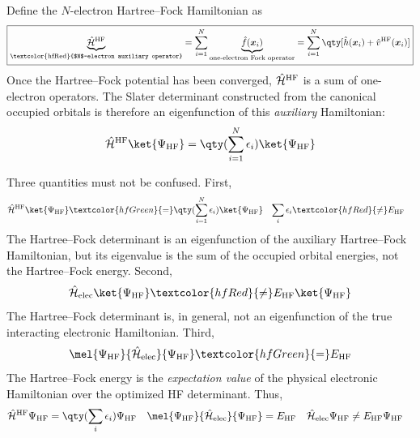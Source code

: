 \documentclass[11pt,a4paper,titlepage]{article}
\numberwithin{equation}{section}
\newcommand{\bx}{\boldsymbol{x}}
\newcommand{\hh}{\Hat{h}}
\newcommand{\hf}{\Hat{f}}
\newcommand{\chH}{\Hat{\mathcal{H}}}
\newcommand{\red}[1]{\textcolor{hfRed}{#1}}
\newcommand{\green}[1]{\textcolor{hfGreen}{#1}}
\begin{document}
Define the $N$-electron Hartree--Fock Hamiltonian as
\begin{equation}
  \boxed{
  \underbrace{
    \chH^\text{HF}
  }_{\text{\red{$N$-electron auxiliary operator}}}
  =
  \sum_{i=1}^{N}
  \underbrace{
    \hf(\bx_i)
  }_{\text{one-electron Fock operator}}
  =
  \sum_{i=1}^{N}
  \qty[
    \hh(\bx_i)
    +
    \Hat{v}^\text{HF}(\bx_i)
  ]
  }
  \label{eq:hf-auxiliary-hamiltonian}
\end{equation}
Once the Hartree--Fock potential has been converged, $\chH^\text{HF}$ is a sum of
one-electron operators. The Slater determinant constructed from the
canonical occupied orbitals is therefore an eigenfunction of this
\emph{auxiliary} Hamiltonian:
\begin{equation}
  \chH^\text{HF}
  \ket{\Psi_\text{HF}}
  =
  \qty(
    \sum_{i=1}^{N}\epsilon_i
  )
  \ket{\Psi_\text{HF}}
\end{equation}

Three quantities must not be confused.
First,
\begin{align}
  \chH^\text{HF}
  \ket{\Psi_\text{HF}}
  &\green{=}
  \qty(
    \sum_{i=1}^{N}\epsilon_i
  )
  \ket{\Psi_\text{HF}}
  &
  \sum_i\epsilon_i
  &\red{\neq}
  E_\text{HF}
\end{align}
The Hartree--Fock determinant is an eigenfunction of the auxiliary Hartree--Fock Hamiltonian, but
its eigenvalue is the sum of the occupied orbital energies, not the Hartree--Fock energy.
Second,
\begin{equation}
  \chH_\text{elec}
  \ket{\Psi_\text{HF}}
  \red{\neq}
  E_\text{HF}
  \ket{\Psi_\text{HF}}
\end{equation}
The Hartree--Fock determinant is, in general, \red{not} an eigenfunction of the true
interacting electronic Hamiltonian.
Third,
\begin{equation}
  \mel{\Psi_\text{HF}}
      {\chH_\text{elec}}
      {\Psi_\text{HF}}
  \green{=}
  E_\text{HF}
\end{equation}
The Hartree--Fock energy is the \emph{expectation value} of the physical
electronic Hamiltonian over the optimized HF determinant.
Thus,
\begin{align}
    \chH^\text{HF}\Psi_\text{HF}
    &=
    \qty(\sum_i\epsilon_i)\Psi_\text{HF}
    &
    \mel{\Psi_\text{HF}}
        {\chH_\text{elec}}
        {\Psi_\text{HF}}
    &=
    E_\text{HF}
    &
    \chH_\text{elec}\Psi_\text{HF}
    &\neq
    E_\text{HF}\Psi_\text{HF}
\end{align}

\end{document}
